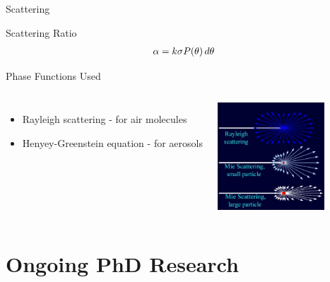 \documentclass[compress,red,12pt]{beamer}
\begin{document}
%
%
\begin{frame}[label=current]{Scattering}
    \begin{overprint}
      {
        \centerline{\def\svgwidth{0.6\linewidth}\small{}}
      }
      {
        \centerline{\def\svgwidth{0.6\linewidth}\small{}}
      }
      {
        \centerline{\def\svgwidth{0.6\linewidth}\small{}}
      }
    \end{overprint}
    {
      \begin{center}{Scattering Ratio}
        \begin{align*}
          \alpha = k \sigma P(\theta) \,d{\theta}
        \end{align*}
      \end{center}
    }
\end{frame}


\begin{frame}[T]{Phase Functions Used}
  \begin{columns}[T]
    \begin{itemize}
    \item Rayleigh scattering - for air molecules
    \item Henyey-Greenstein equation - for aerosols
    \end{itemize}
    \centering
    \includegraphics[height=4cm]{images/Mie_Rayleigh.jpg}
  \end{columns}
\end{frame}


\section{Ongoing PhD Research}
\end{document}

